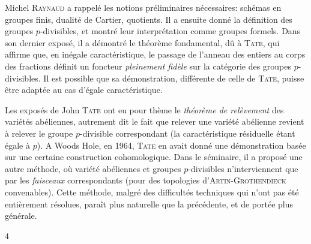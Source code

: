 Michel \textsc{Raynaud} a rappelé les notions préliminaires nécessaires: schémas en groupes finis, dualité de Cartier, quotients. Il a ensuite donné la définition des groupes $p$-divisibles, et montré leur interprétation comme groupes formels. Dans son dernier exposé, il a démontré le théorème fondamental, dû à \textsc{Tate}, qui affirme que, en inégale caractéristique, le passage de l'anneau des entiers au corps des fractions définit un foncteur \textit{pleinement fidèle} sur la catégorie des groupes $p$-divisibles. Il est possible que sa démonstration, différente de celle de \textsc{Tate}, puisse être adaptée au cas d'égale caractéristique.

Les exposés de John \textsc{Tate} ont eu pour thème le \textit{théorème de relèvement} des variétés abéliennes, autrement dit le fait que relever une variété abélienne revient à relever le groupe $p$-divisible correspondant (la caractéristique résiduelle étant égale à $p$). A Woods Hole, en 1964, \textsc{Tate} en avait donné une démonstration basée sur une certaine construction cohomologique. Dans le séminaire, il a proposé une autre méthode, où variété abéliennes et groupes $p$-divisibles n'interviennent que par les \textit{faisceaux} correspondants (pour des topologies d'\textsc{Artin-Grothendieck} convenables). Cette méthode, malgré des difficultés techniques qui n'ont pas été entièrement résolues, paraît plus naturelle que la précédente, et de portée plus générale.

4
